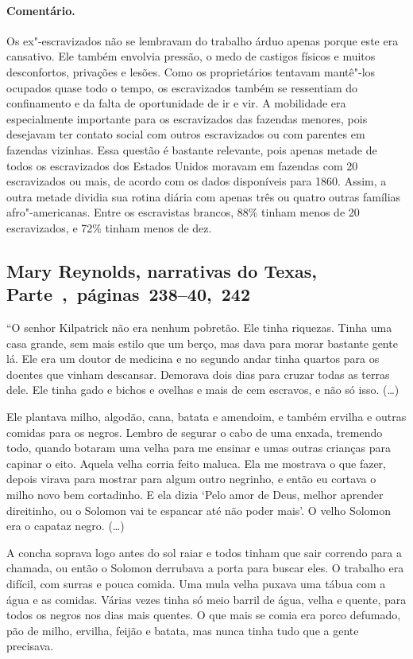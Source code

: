 \paragraph{Comentário.}\quad
{\small
Os ex"-escravizados não se lembravam do trabalho árduo apenas porque
este era cansativo. Ele também envolvia pressão, o medo de castigos
físicos e muitos desconfortos, privações e lesões. Como os proprietários
tentavam mantê"-los ocupados quase todo o tempo, os escravizados também se
ressentiam do confinamento e da falta de oportunidade de ir e vir. A
mobilidade era especialmente importante para os escravizados das fazendas
menores, pois desejavam ter contato social com outros escravizados ou com
parentes em fazendas vizinhas. Essa questão é bastante relevante, pois
apenas metade de todos os escravizados dos Estados Unidos moravam em
fazendas com 20 escravizados ou mais, de acordo com os dados disponíveis
para 1860. Assim, a outra metade dividia sua rotina diária com apenas
três ou quatro outras famílias afro"-americanas. Entre os escravistas
brancos, 88\% tinham menos de 20 escravizados, e 72\% tinham menos de dez.
}


\subsection{Mary Reynolds, narrativas do Texas, Parte~,~páginas~238--40,~242}
\label{ref222}

``O senhor Kilpatrick não era nenhum pobretão. Ele tinha riquezas. Tinha
uma casa grande, sem mais estilo que um berço, mas dava para morar
bastante gente lá. Ele era um doutor de medicina e no segundo andar
tinha quartos para os doentes que vinham descansar. Demorava dois dias
para cruzar todas as terras dele. Ele tinha gado e bichos e ovelhas e
mais de cem escravos, e não só isso. (\ldots{})

Ele plantava milho, algodão, cana, batata e amendoim, e também ervilha e
outras comidas para os negros. Lembro de segurar o cabo de uma enxada,
tremendo todo, quando botaram uma velha para me ensinar e umas outras
crianças para capinar o eito. Aquela velha corria feito maluca. Ela me
mostrava o que fazer, depois virava para mostrar para algum outro
negrinho, e então eu cortava o milho novo bem cortadinho. E ela dizia
`Pelo amor de Deus, melhor aprender direitinho, ou o Solomon vai te
espancar até não poder mais'. O velho Solomon era o capataz negro.
(\ldots{})

A concha soprava logo antes do sol raiar e todos tinham que sair
correndo para a chamada, ou então o Solomon derrubava a porta para
buscar eles. O trabalho era difícil, com surras e pouca comida. Uma mula
velha puxava uma tábua com a água e as comidas. Várias vezes tinha só
meio barril de água, velha e quente, para todos os negros nos dias mais
quentes. O que mais se comia era porco defumado, pão de milho, ervilha,
feijão e batata, mas nunca tinha tudo que a gente precisava.

